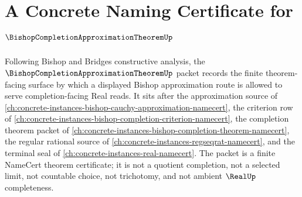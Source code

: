 \chapter{A Concrete Naming Certificate for $\BishopCompletionApproximationTheoremUp$}
\label{ch:concrete-instances-bishop-completion-approximation-theorem-namecert}

Following Bishop and Bridges constructive analysis, the $\BishopCompletionApproximationTheoremUp$ packet records the finite theorem-facing surface by which a displayed Bishop approximation route is allowed to serve completion-facing Real reads. It sits after the approximation source of \autoref{ch:concrete-instances-bishop-cauchy-approximation-namecert}, the criterion row of \autoref{ch:concrete-instances-bishop-completion-criterion-namecert}, the completion theorem packet of \autoref{ch:concrete-instances-bishop-completion-theorem-namecert}, the regular rational source of \autoref{ch:concrete-instances-regseqrat-namecert}, and the terminal seal of \autoref{ch:concrete-instances-real-namecert}. The packet is a finite NameCert theorem certificate; it is not a quotient completion, not a selected limit, not countable choice, not trichotomy, and not ambient $\RealUp$ completeness.

